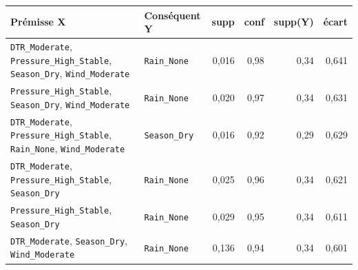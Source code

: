 \footnotesize
\begin{tabular}{>{\raggedright\arraybackslash}p{4.7cm}>{\raggedright\arraybackslash}p{4.4cm}rrrr}
\toprule
\rowcolor{NuitBleue!90}
\color{white}\textbf{Prémisse X} & \color{white}\textbf{Conséquent Y} & \color{white}\textbf{supp} & \color{white}\textbf{conf} & \color{white}\textbf{supp(Y)} & \color{white}\textbf{écart} \\
\midrule
\texttt{DTR\_Moderate}, \texttt{Pressure\_High\_Stable}, \texttt{Season\_Dry}, \texttt{Wind\_Moderate} & \texttt{Rain\_None} & 0,016 & 0,98 & 0,34 & 0,641 \\
\texttt{Pressure\_High\_Stable}, \texttt{Season\_Dry}, \texttt{Wind\_Moderate} & \texttt{Rain\_None} & 0,020 & 0,97 & 0,34 & 0,631 \\
\texttt{DTR\_Moderate}, \texttt{Pressure\_High\_Stable}, \texttt{Rain\_None}, \texttt{Wind\_Moderate} & \texttt{Season\_Dry} & 0,016 & 0,92 & 0,29 & 0,629 \\
\texttt{DTR\_Moderate}, \texttt{Pressure\_High\_Stable}, \texttt{Season\_Dry} & \texttt{Rain\_None} & 0,025 & 0,96 & 0,34 & 0,621 \\
\texttt{Pressure\_High\_Stable}, \texttt{Season\_Dry} & \texttt{Rain\_None} & 0,029 & 0,95 & 0,34 & 0,611 \\
\texttt{DTR\_Moderate}, \texttt{Season\_Dry}, \texttt{Wind\_Moderate} & \texttt{Rain\_None} & 0,136 & 0,94 & 0,34 & 0,601 \\
\bottomrule
\end{tabular}
